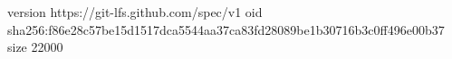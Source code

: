 version https://git-lfs.github.com/spec/v1
oid sha256:f86e28c57be15d1517dca5544aa37ca83fd28089be1b30716b3c0ff496e00b37
size 22000
